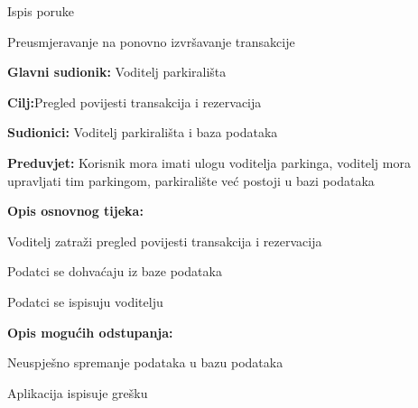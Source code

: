 \begin{packed_item}
\begin{packed_item}
\begin{packed_item}
\begin{packed_enum}
							\item Ispis poruke
							\item Preusmjeravanje na ponovno izvršavanje transakcije
							
						\end{packed_enum}
    					
    				\end{packed_item}
    			\end{packed_item}
    				\noindent {}
    				\begin{packed_item}
    					
    					\item \textbf{Glavni sudionik: }Voditelj parkirališta
    					\item  \textbf{Cilj:}Pregled povijesti transakcija i rezervacija 
    					\item  \textbf{Sudionici:} Voditelj parkirališta i baza podataka
    					\item  \textbf{Preduvjet:} Korisnik mora imati ulogu voditelja parkinga, voditelj mora upravljati tim parkingom, parkiralište već postoji u bazi podataka
    					\item  \textbf{Opis osnovnog tijeka:}
    					
    					\item[] \begin{packed_enum}
    						
    						\item Voditelj zatraži pregled povijesti transakcija i rezervacija
    						\item Podatci se dohvaćaju iz baze podataka
    						\item Podatci se ispisuju voditelju
    						
    					\end{packed_enum}
    					
    					\item  \textbf{Opis mogućih odstupanja:}
    					
    					\item[] \begin{packed_item}
    						
    					\item[2.a] Neuspješno spremanje podataka u bazu podataka	
    					\item[] \begin{packed_enum}
    						
    						\item Aplikacija ispisuje grešku
    						

\end{packed_enum}
\end{packed_item}
\end{packed_item}
\end{packed_item}
